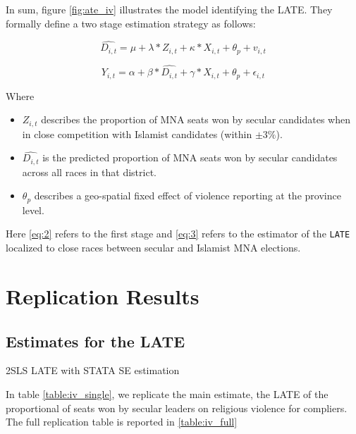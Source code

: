 \documentclass{scrartcl}
\begin{document}
In sum, figure \ref{fig:ate_iv} illustrates the model identifying the LATE.
They formally define a two stage estimation strategy as follows:

\begin{equation} \label{eq:2}
  \widehat{D_{i,t}} = \mu + \lambda * Z_{i,t} + \kappa*X_{i,t} + \theta_p + v_{i,t}
\end{equation}

 \begin{equation} \label{eq:3}
  Y_{i,t} = \alpha + \beta * \widehat{D_{i,t}} + \gamma*X_{i,t} + \theta_{p} + \epsilon_{i,t}
\end{equation}

Where

\begin{itemize}
\item $Z_{i,t}$ describes the proportion of MNA seats won by secular candidates when in close competition with Islamist candidates (within $\pm 3\%$).
\item $\widehat{D_{i,t}}$ is the predicted proportion of MNA seats won by secular candidates across all races in that district.
\item $\theta_p$ describes a geo-spatial fixed effect of violence reporting at the province level. 
\end{itemize}

Here \ref{eq:2} refers to the first stage and \ref{eq:3} refers to the estimator of the \texttt{LATE} localized to close races between secular and Islamist MNA elections.  

\section{Replication Results} \label{main_results}
\subsection{Estimates for the LATE} \label{late_results}

\begin{table}[ht]
  \begin{center}
    \scalebox{0.75}{
      
    }
    \caption{2SLS LATE with STATA SE estimation}
    \label{table:iv_single}
  \end{center}
\end{table}

In table \ref{table:iv_single}, we replicate the main estimate, the LATE of the proportional of seats won by secular leaders on religious violence for compliers. The full replication table is reported in \ref{table:iv_full}
\end{document}
